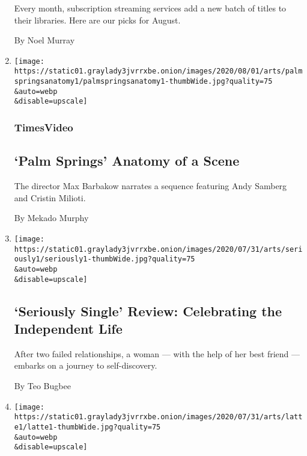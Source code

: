 \begin{enumerate}
  Every month, subscription streaming services add a new batch of titles
  to their libraries. Here are our picks for August.

  By Noel Murray
\item
  \href{/video/movies/100000007265338/palm-springs-scene.html}{}

  \texttt{[image: https://static01.graylady3jvrrxbe.onion/images/2020/08/01/arts/palmspringsanatomy1/palmspringsanatomy1-thumbWide.jpg?quality=75\\\&auto=webp\\\&disable=upscale]}

  \hypertarget{timesvideo}{%
  \subsubsection{TimesVideo}\label{timesvideo}}

  \hypertarget{palm-springs--anatomy-of-a-scene}{%
  \subsection{`Palm Springs' \textbar{} Anatomy of a
  Scene}\label{palm-springs--anatomy-of-a-scene}}

  The director Max Barbakow narrates a sequence featuring Andy Samberg
  and Cristin Milioti.

  By Mekado Murphy
\item
  \href{/2020/07/31/movies/seriously-single-review.html}{}

  \texttt{[image: https://static01.graylady3jvrrxbe.onion/images/2020/07/31/arts/seriously1/seriously1-thumbWide.jpg?quality=75\\\&auto=webp\\\&disable=upscale]}

  \hypertarget{seriously-single-review-celebrating-the-independent-life}{%
  \subsection{`Seriously Single' Review: Celebrating the Independent
  Life}\label{seriously-single-review-celebrating-the-independent-life}}

  After two failed relationships, a woman --- with the help of her best
  friend --- embarks on a journey to self-discovery.

  By Teo Bugbee
\item
  \href{/2020/07/31/movies/latte-and-the-magic-waterstone-review.html}{}

  \texttt{[image: https://static01.graylady3jvrrxbe.onion/images/2020/07/31/arts/latte1/latte1-thumbWide.jpg?quality=75\\\&auto=webp\\\&disable=upscale]}


\end{enumerate}
